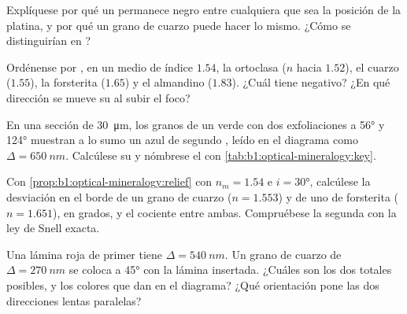 \begin{exercise}[$\star$]\label{exo:b1:optical-mineralogy:3}
Explíquese por qué un  permanece negro entre  cualquiera que sea la posición de la platina, y por qué
un grano de cuarzo puede hacer lo mismo. ¿Cómo se distinguirían en ?
\end{exercise}

\begin{exercise}[$\star$]\label{exo:b1:optical-mineralogy:4}
Ordénense por , en un medio de índice $1.54$, la ortoclasa ($n$ hacia $1.52$), el cuarzo ($1.55$), la forsterita
($1.65$) y el almandino ($1.83$). ¿Cuál tiene  negativo? ¿En qué dirección se mueve su  al subir el foco?
\end{exercise}

\begin{exercise}[$\star\star$]\label{exo:b1:optical-mineralogy:5}
En una sección de \qty{30}{\micro m}, los granos de un  verde  con dos exfoliaciones a \ang{56} y \ang{124}
muestran a lo sumo un azul de segundo , leído en el diagrama como $\Delta = \qty{650}{nm}$. Calcúlese su
 y nómbrese el  con \cref{tab:b1:optical-mineralogy:key}.
\end{exercise}

\begin{exercise}[$\star\star$]\label{exo:b1:optical-mineralogy:6}
Con \cref{prop:b1:optical-mineralogy:relief} con $n_m = 1.54$ e $i = \ang{30}$, calcúlese la desviación en el borde de un
grano de cuarzo ($n = 1.553$) y de uno de forsterita ($n = 1.651$), en grados, y el cociente entre ambas. Compruébese la
segunda con la ley de Snell exacta.
\end{exercise}

\begin{exercise}[$\star\star$]\label{exo:b1:optical-mineralogy:7}
Una lámina roja de primer  tiene $\Delta = \qty{540}{nm}$. Un grano de cuarzo de $\Delta = \qty{270}{nm}$ se coloca a
\ang{45} con la lámina insertada. ¿Cuáles son los dos  totales posibles, y los colores que dan en el diagrama?
¿Qué orientación pone las dos direcciones lentas paralelas?
\end{exercise}

